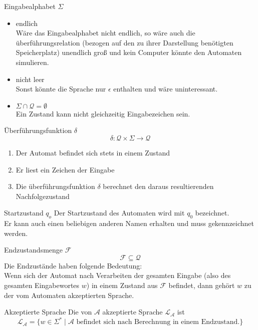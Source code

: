 \documentclass[]{beamer}
\begin{document}
\begin{frame}[squeeze]{}
  \begin{block}{Eingabealphabet $\Sigma$}
    \begin{itemize}
      \item endlich \\
        W\"are das Eingabealphabet nicht endlich, so w\"are auch die überführungsrelation (bezogen auf den zu ihrer Darstellung ben\"otigten Speicherplatz) unendlich groß und kein Computer k\"onnte den Automaten simulieren.
      \item nicht leer \\
        Sonst k\"onnte die Sprache nur $\epsilon$ enthalten und w\"are uninteressant.
      \item $\Sigma \cap \mathcal{Q} = \emptyset$ \\
        Ein Zustand kann nicht gleichzeitig Eingabezeichen sein.
    \end{itemize}
  \end{block}
\end{frame}

\begin{frame}[<+->][squeeze]{}
  \begin{block}{Überführungsfunktion $\delta$}
    \[\delta : \mathcal{Q} \times \Sigma \rightarrow \mathcal{Q}\]
    \begin{enumerate}
      \item<1-> Der Automat befindet sich stets in einem Zustand
      \item<1-> Er liest ein Zeichen der Eingabe
      \item<1-> Die überführungsfunktion $\delta$ berechnet den daraus resultierenden Nachfolgezustand
    \end{enumerate}
  \end{block}
  
  \begin{block}{Startzustand $q_o$}
    Der Startzustand des Automaten wird mit $q_0$ bezeichnet. \\
    Er kann auch einen beliebigen anderen Namen erhalten und muss gekennzeichnet werden.
  \end{block}
\end{frame}

\begin{frame}[<+->][squeeze]{}
  \begin{block}{Endzustandsmenge $\mathcal{F}$}
    \[\mathcal{F} \subseteq \mathcal{Q}\]
    Die Endzust\"ande haben folgende Bedeutung: \\
    Wenn sich der Automat nach Verarbeiten der gesamten Eingabe (also des gesamten Eingabewortes $w$) in einem Zustand aus $\mathcal{F}$ befindet, dann geh\"ort $w$ zu der vom Automaten akzeptierten Sprache.
  \end{block}
  
  \begin{block}{Akzeptierte Sprache}
    Die von $\mathcal{A}$ akzeptierte Sprache $\mathcal{L}_\mathcal{A}$ ist
    \[\mathcal{L_A} = \{w \in \Sigma^* \;|\; \mathcal{A} \text{ befindet sich nach Berechnung in einem Endzustand.} \}\]
  \end{block}
\end{frame}
\end{document}
